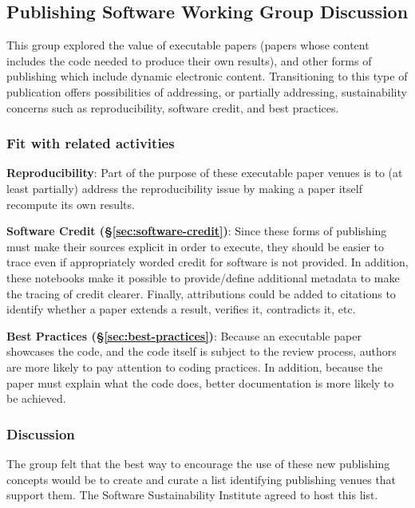 \subsection{Publishing Software Working Group Discussion} \label{sec:publishing-software}

This group explored the value of executable papers (papers whose content
includes the code needed to produce their own results), and other forms of
publishing which include dynamic electronic content.
%
%
Transitioning to this type of publication offers possibilities of addressing, or
partially addressing, sustainability concerns such as reproducibility, software
credit, and best practices.

\subsubsection{Fit with related activities}

\textbf{Reproducibility}: Part of the purpose of these executable paper venues
is to (at least partially) address the reproducibility issue by making a paper
itself recompute its own results.

\textbf{Software Credit (\S\ref{sec:software-credit})}: Since these forms of
publishing must make their sources explicit in order to execute, they should be
easier to trace even if appropriately worded credit for software is not
provided. In addition, these notebooks make it possible to provide/define
additional metadata to make the tracing of credit clearer. Finally, attributions
could be added to citations to identify whether a paper extends a result,
verifies it, contradicts it, etc.

\textbf{Best Practices (\S\ref{sec:best-practices})}: Because an executable
paper showcases the code, and the code itself is subject to the review process,
authors are more likely to pay attention to coding practices. In addition,
because the paper must explain what the code does, better documentation is
more likely to be achieved.

\subsubsection{Discussion}

The group felt that the best way to encourage the use of these new publishing
concepts would be to create and curate a list identifying publishing venues that
support them. The Software Sustainability Institute agreed to host this list.

